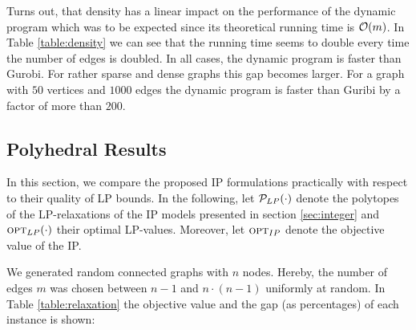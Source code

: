 Turns out, that density has a linear impact on the performance of the dynamic program which was to be expected since its theoretical running time is $\mathcal{O}(m)$. In Table \ref{table:density} we can see that the running time seems to double every time the number of edges is doubled. In all cases, the dynamic program is faster than Gurobi. For rather sparse and dense graphs this gap becomes larger. For a graph with $50$ vertices and $1000$ edges the dynamic program is faster than Guribi by a factor of more than $200$.

\subsection{Polyhedral Results}
\label{sec:study:poly}

In this section, we compare the proposed IP formulations practically with respect to their quality of LP bounds. In the following, let $\mathcal{P}_{LP}(\cdot)$ denote the polytopes of the LP-relaxations of the IP models presented in section \ref{sec:integer} and $\textsc{opt}_{LP}(\cdot)$ their optimal LP-values. Moreover, let $\textsc{opt}_{IP}$ denote the objective value of the IP.\medskip

We generated random connected graphs with $n$ nodes. Hereby, the number of edges $m$ was chosen between $n - 1$ and $n \cdot (n - 1)$ uniformly at random. In Table \ref{table:relaxation} the objective value and the gap (as percentages) of each instance is shown:

